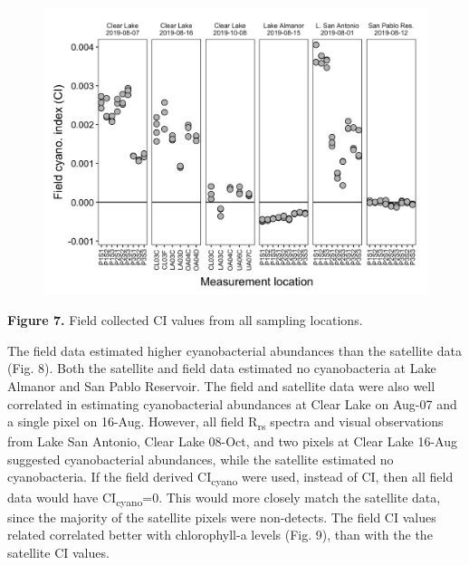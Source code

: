\documentclass[]{article}
\begin{document}
\begin{figure}

{\centering \includegraphics[width=27.08in]{../Data/Figures_output/ci_wbd} 

}

\end{figure}

\textbf{Figure 7.} Field collected CI values from all sampling
locations.

The field data estimated higher cyanobacterial abundances than the
satellite data (Fig. 8). Both the satellite and field data estimated no
cyanobacteria at Lake Almanor and San Pablo Reservoir. The field and
satellite data were also well correlated in estimating cyanobacterial
abundances at Clear Lake on Aug-07 and a single pixel on 16-Aug.
However, all field R\textsubscript{rs} spectra and visual observations
from Lake San Antonio, Clear Lake 08-Oct, and two pixels at Clear Lake
16-Aug suggested cyanobacterial abundances, while the satellite
estimated no cyanobacteria. If the field derived CI\textsubscript{cyano}
were used, instead of CI, then all field data would have
CI\textsubscript{cyano}=0. This would more closely match the satellite
data, since the majority of the satellite pixels were non-detects. The
field CI values related correlated better with chlorophyll-a levels
(Fig. 9), than with the the satellite CI values.
\end{document}
